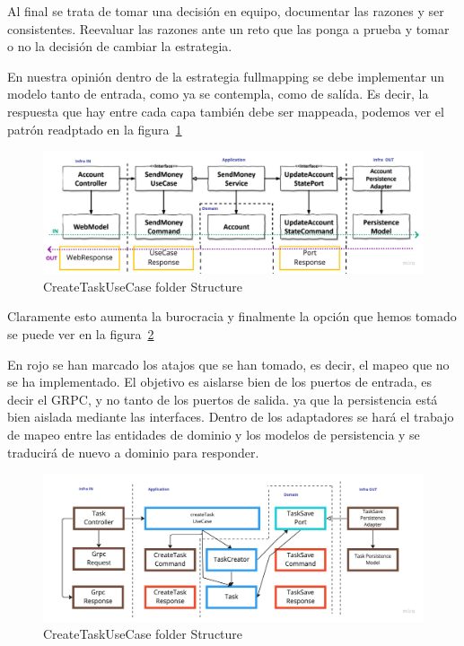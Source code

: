 Al final se trata de tomar una decisión en equipo, documentar las razones y ser consistentes. Reevaluar las razones ante un reto que las ponga a prueba y tomar o no la decisión de cambiar la estrategia.

En nuestra opinión dentro de la estrategia fullmapping se debe implementar un modelo tanto de entrada, como ya se contempla, como de salída. Es decir, la respuesta que hay entre cada capa también debe ser mappeada, podemos ver el patrón readptado en la figura~\cref{fig:GetHandMapping}

\begin{figure}[H]
    \centering
    \includegraphics[height=0.2\textheight]{./part/Ejecucion/Seguimiento/CreateTaskUseCase/img/PFM - GetHandMapping}
    \caption{CreateTaskUseCase folder Structure\cite{TomHombergs2019GYHD}}\label{fig:GetHandMapping}
\end{figure}

Claramente esto aumenta la burocracia y finalmente la opción que hemos tomado se puede ver en la figura~\cref{fig:CreateTaskUseCaseMapping}

En rojo se han marcado los atajos que se han tomado, es decir, el mapeo que no se ha implementado. El objetivo es aislarse bien de los puertos de entrada, es decir el GRPC, y no tanto de los puertos de salida. ya que la persistencia está bien aislada mediante las interfaces. Dentro de los adaptadores se hará el trabajo de mapeo entre las entidades de dominio y los modelos de persistencia y se traducirá de nuevo a dominio para responder.

\begin{figure}[H]
    \centering
    \includegraphics[height=0.2\textheight]{./part/Ejecucion/Seguimiento/CreateTaskUseCase/img/PFM - FinalMapping}
    \caption{CreateTaskUseCase folder Structure}\label{fig:CreateTaskUseCaseMapping}
\end{figure}

